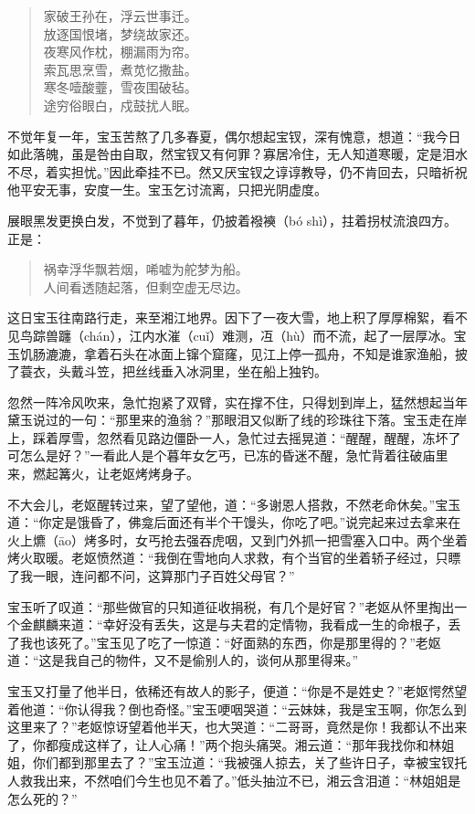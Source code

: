 \documentclass[12pt,oneside]{book}
\newenvironment{shici}{%
\begin{verse}%
\centering\large\hspace{12pt}}%
{\end{verse}}
\begin{document}
\begin{shici}
家破王孙在，浮云世事迁。\\
放逐国恨堵，梦绕故家还。\\
夜寒风作枕，棚漏雨为帘。 \\
索瓦思烹雪，煮苋忆撒盐。 \\
寒冬噎酸虀，雪夜围破毡。 \\
途穷俗眼白，戍鼓扰人眠。 
\end{shici}


不觉年复一年，宝玉苦熬了几多春夏，偶尔想起宝钗，深有愧意，想道：“我今日如此落魄，虽是咎由自取，然宝钗又有何罪？寡居冷住，无人知道寒暖，定是泪水不尽，着实担忧。”因此牵挂不已。然又厌宝钗之谆谆教导，仍不肯回去，只暗祈祝他平安无事，安度一生。宝玉乞讨流离，只把光阴虚度。

展眼黑发更换白发，不觉到了暮年，仍披着襏襫（bó shì），拄着拐杖流浪四方。正是：

\begin{shici}
祸幸浮华飘若烟，唏嘘为舵梦为船。\\
人间看透随起落，但剩空虚无尽边。
\end{shici}

这日宝玉往南路行走，来至湘江地界。因下了一夜大雪，地上积了厚厚棉絮，看不见鸟踪兽躔（chán），江内水漼（cuǐ）难测，冱（hù）而不流，起了一层厚冰。宝玉饥肠漉漉，拿着石头在冰面上镩个窟窿，见江上停一孤舟，不知是谁家渔船，披了蓑衣，头戴斗笠，把丝线垂入冰洞里，坐在船上独钓。

忽然一阵冷风吹来，急忙抱紧了双臂，实在撑不住，只得划到岸上，猛然想起当年黛玉说过的一句：“那里来的渔翁？”那眼泪又似断了线的珍珠往下落。宝玉走在岸上，踩着厚雪，忽然看见路边僵卧一人，急忙过去摇晃道：“醒醒，醒醒，冻坏了可怎么是好？”一看此人是个暮年女乞丐，已冻的昏迷不醒，急忙背着往破庙里来，燃起篝火，让老妪烤烤身子。

不大会儿，老妪醒转过来，望了望他，道：“多谢恩人搭救，不然老命休矣。”宝玉道：“你定是饿昏了，佛龛后面还有半个干馒头，你吃了吧。”说完起来过去拿来在火上爊（āo）烤多时，女丐抢去强吞虎咽，又到门外抓一把雪塞入口中。两个坐着烤火取暖。老妪愤然道：“我倒在雪地向人求救，有个当官的坐着轿子经过，只瞟了我一眼，连问都不问，这算那门子百姓父母官？”

宝玉听了叹道：“那些做官的只知道征收捐税，有几个是好官？”老妪从怀里掏出一个金麒麟来道：“幸好没有丢失，这是与夫君的定情物，我看成一生的命根子，丢了我也该死了。”宝玉见了吃了一惊道：“好面熟的东西，你是那里得的？”老妪道：“这是我自己的物件，又不是偷别人的，谈何从那里得来。”

宝玉又打量了他半日，依稀还有故人的影子，便道：“你是不是姓史？”老妪愕然望着他道：“你认得我？倒也奇怪。”宝玉哽咽哭道：“云妹妹，我是宝玉啊，你怎么到这里来了？”老妪惊讶望着他半天，也大哭道：“二哥哥，竟然是你！我都认不出来了，你都瘦成这样了，让人心痛！”两个抱头痛哭。湘云道：“那年我找你和林姐姐，你们都到那里去了？”宝玉泣道：“我被强人掠去，关了些许日子，幸被宝钗托人救我出来，不然咱们今生也见不着了。”低头抽泣不已，湘云含泪道：“林姐姐是怎么死的？”
\end{document}

